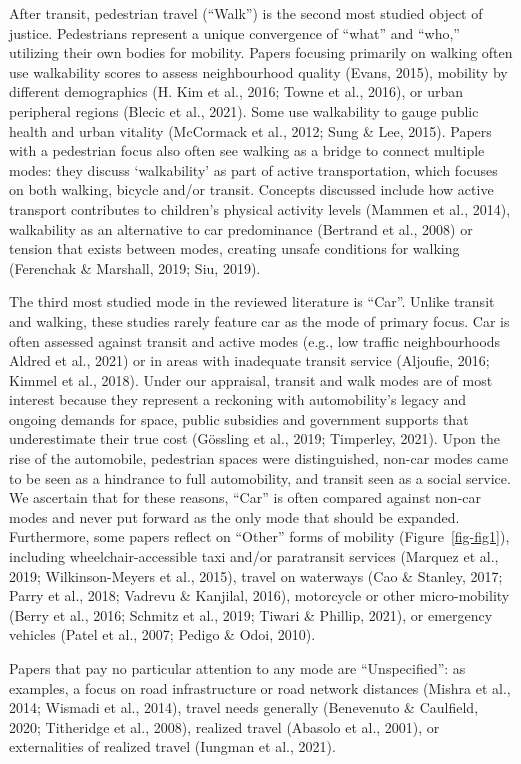 \documentclass[
  letterpaper,
  DIV=11,
  numbers=noendperiod]{scrartcl}
\begin{document}
After transit, pedestrian travel (``Walk'') is the second most studied
object of justice. Pedestrians represent a unique convergence of
``what'' and ``who,'' utilizing their own bodies for mobility. Papers
focusing primarily on walking often use walkability scores to assess
neighbourhood quality (Evans, 2015), mobility by different demographics
(H. Kim et al., 2016; Towne et al., 2016), or urban peripheral regions
(Blecic et al., 2021). Some use walkability to gauge public health and
urban vitality (McCormack et al., 2012; Sung \& Lee, 2015). Papers with
a pedestrian focus also often see walking as a bridge to connect
multiple modes: they discuss `walkability' as part of active
transportation, which focuses on both walking, bicycle and/or transit.
Concepts discussed include how active transport contributes to
children's physical activity levels (Mammen et al., 2014), walkability
as an alternative to car predominance (Bertrand et al., 2008) or tension
that exists between modes, creating unsafe conditions for walking
(Ferenchak \& Marshall, 2019; Siu, 2019).

The third most studied mode in the reviewed literature is ``Car''.
Unlike transit and walking, these studies rarely feature car as the mode
of primary focus. Car is often assessed against transit and active modes
(e.g., low traffic neighbourhoods Aldred et al., 2021) or in areas with
inadequate transit service (Aljoufie, 2016; Kimmel et al., 2018). Under
our appraisal, transit and walk modes are of most interest because they
represent a reckoning with automobility's legacy and ongoing demands for
space, public subsidies and government supports that underestimate their
true cost (Gössling et al., 2019; Timperley, 2021). Upon the rise of the
automobile, pedestrian spaces were distinguished, non-car modes came to
be seen as a hindrance to full automobility, and transit seen as a
social service. We ascertain that for these reasons, ``Car'' is often
compared against non-car modes and never put forward as the only mode
that should be expanded. Furthermore, some papers reflect on ``Other''
forms of mobility (Figure~\ref{fig-fig1}), including
wheelchair-accessible taxi and/or paratransit services (Marquez et al.,
2019; Wilkinson-Meyers et al., 2015), travel on waterways (Cao \&
Stanley, 2017; Parry et al., 2018; Vadrevu \& Kanjilal, 2016),
motorcycle or other micro-mobility (Berry et al., 2016; Schmitz et al.,
2019; Tiwari \& Phillip, 2021), or emergency vehicles (Patel et al.,
2007; Pedigo \& Odoi, 2010).

Papers that pay no particular attention to any mode are ``Unspecified'':
as examples, a focus on road infrastructure or road network distances
(Mishra et al., 2014; Wismadi et al., 2014), travel needs generally
(Benevenuto \& Caulfield, 2020; Titheridge et al., 2008), realized
travel (Abasolo et al., 2001), or externalities of realized travel
(Iungman et al., 2021).
\end{document}
